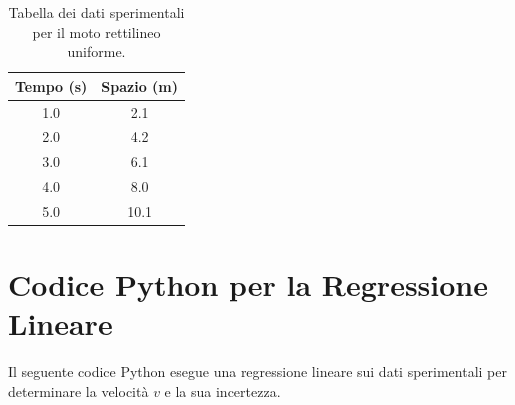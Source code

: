 \documentclass[a4paper,12pt]{article}
\begin{document}
\begin{table}[h!]
\centering
\begin{tabular}{|c|c|}
\hline
Tempo (s) & Spazio (m) \\
\hline
1.0 & 2.1 \\
2.0 & 4.2 \\
3.0 & 6.1 \\
4.0 & 8.0 \\
5.0 & 10.1 \\
\hline
\end{tabular}
\caption{Tabella dei dati sperimentali per il moto rettilineo uniforme.}
\end{table}
\newpage
\section{Codice Python per la Regressione Lineare}
Il seguente codice Python esegue una regressione lineare sui dati sperimentali per determinare la velocità \( v \) e la sua incertezza.
\end{document}
